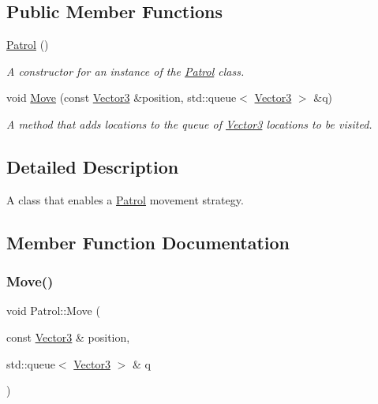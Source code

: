 \subsection*{Public Member Functions}
\begin{DoxyCompactItemize}
\item 
\mbox{\label{classPatrol_a4edb1a1832b28cf65f2a7003782af96a}} 
\hyperlink{classPatrol_a4edb1a1832b28cf65f2a7003782af96a}{Patrol} ()
\begin{DoxyCompactList}\small\item\em A constructor for an instance of the \hyperlink{classPatrol}{Patrol} class. \end{DoxyCompactList}\item 
void \hyperlink{classPatrol_adb1a2e74fc26e331a279262dc1c5b37e}{Move} (const \hyperlink{classVector3}{Vector3} \&position, std\+::queue$<$ \hyperlink{classVector3}{Vector3} $>$ \&q)
\begin{DoxyCompactList}\small\item\em A method that adds locations to the queue of \hyperlink{classVector3}{Vector3} locations to be visited. \end{DoxyCompactList}\end{DoxyCompactItemize}


\subsection{Detailed Description}
A class that enables a \hyperlink{classPatrol}{Patrol} movement strategy. 

\subsection{Member Function Documentation}
\mbox{\label{classPatrol_adb1a2e74fc26e331a279262dc1c5b37e}} 
\subsubsection{\texorpdfstring{Move()}{Move()}}
{\footnotesize\ttfamily void Patrol\+::\+Move (\begin{DoxyParamCaption}\item[{const \hyperlink{classVector3}{Vector3} \&}]{position,  }\item[{std\+::queue$<$ \hyperlink{classVector3}{Vector3} $>$ \&}]{q }\end{DoxyParamCaption})\hspace{0.3cm}{\ttfamily [virtual]}}



